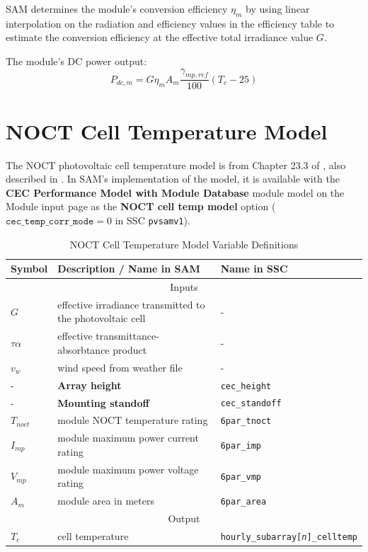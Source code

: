 \documentclass[12pt,letterpaper]{article}
\begin{document}
SAM determines the module's conversion efficiency $\eta_m$ by using linear interpolation on the radiation and efficiency values in the efficiency table to estimate the conversion efficiency at the effective total irradiance value $G$.

The module's DC power output:
\begin{equation}
P_{dc,m} = G \eta_m A_m \frac{\gamma_{mp,ref}}{100} (T_c - 25)
\end{equation}


\section{NOCT Cell Temperature Model} \label{sec-tcnoct}

The NOCT photovoltaic cell temperature model is from Chapter 23.3 of \citet{duffie2013}, also described in \citet{desoto2004b}. In SAM's implementation of the model, it is available with the \textbf{CEC Performance Model with Module Database} module model on the Module input page as the \textbf{NOCT cell temp model} option ($\mathtt{cec\_temp\_corr\_mode}=0$ in SSC \texttt{pvsamv1}).

\begin{table}
\begin{center}
\caption{NOCT Cell Temperature Model Variable Definitions}
\begin{tabular}{lll}
\midrule
Symbol & Description / \textbf{Name in SAM} & Name in SSC \\
\midrule
\multicolumn{3}{c}{Inputs}\\
$G$ & effective irradiance transmitted to the photovoltaic cell & - \\
$\tau \alpha$ & effective transmittance-absorbtance product & - \\
$v_{w}$ & wind speed from weather file & - \\
- & \textbf{Array height} & \texttt{cec\_height} \\
- & \textbf{Mounting standoff} & \texttt{cec\_standoff} \\
$T_{noct}$ & module NOCT temperature rating & \texttt{6par\_tnoct} \\
$I_{mp}$ & module maximum power current rating & \texttt{6par\_imp} \\
$V_{mp}$ & module maximum power voltage rating & \texttt{6par\_vmp} \\
$A_m$ & module area in meters & \texttt{6par\_area} \\
\midrule
\multicolumn{3}{c}{Output}\\
$T_c$ & cell temperature & \texttt{hourly\_subarray[\textit{n}]\_celltemp} \\
\hline
\end{tabular}
\label{tab-tempnoct}
\end{center}
\end{table}
\end{document}
